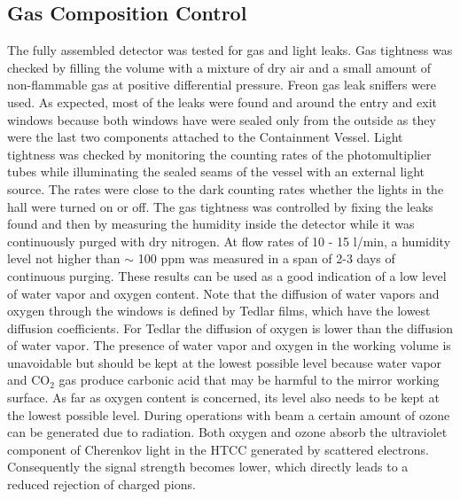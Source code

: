 \subsection{Gas Composition Control}
The fully assembled detector was tested for gas and light leaks. Gas tightness was checked by filling the volume with a mixture of dry air and a small amount of non-flammable gas at positive differential pressure. Freon gas leak sniffers were used. As expected, most of the leaks were found and around the entry and exit windows because both windows have were sealed only from the outside as they were the last two components attached to the Containment Vessel. Light tightness was checked by monitoring the counting rates of the photomultiplier tubes while illuminating the sealed seams of the vessel with an external light source. The rates were close to the dark counting rates whether the lights in the hall were turned on or off. The gas tightness was controlled by fixing the leaks found and then by measuring the humidity inside the detector while it was continuously purged with dry nitrogen. At flow rates of 10 - 15 l/min, a humidity level not higher than $\sim$ 100 ppm was measured in a span of 2-3 days of continuous purging. These results can be used as a good indication of a low level of water vapor and oxygen content. Note that the diffusion of water vapors and oxygen through the windows is defined by Tedlar films, which have the lowest diffusion coefficients. For Tedlar the diffusion of oxygen is lower than the diffusion of water vapor. The presence of water vapor and oxygen in the working volume is unavoidable but should be kept at the lowest possible level because water vapor and CO${_2}$ gas produce carbonic acid that may be harmful to the mirror working surface. As far as oxygen content is concerned, its level also needs to be kept at the lowest possible level. During operations with beam a certain amount of ozone can be generated due to radiation. Both oxygen and ozone absorb the ultraviolet component of Cherenkov light in the HTCC generated by scattered electrons. Consequently the signal strength becomes lower, which directly leads to a reduced rejection of charged pions.

